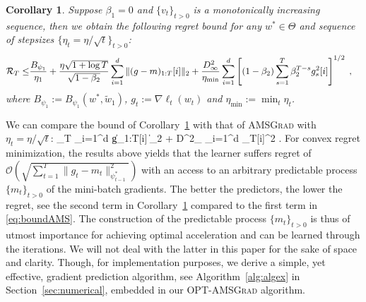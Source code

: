 \documentclass[11pt]{article}
\newtheorem{Corollary}{Corollary}
\theoremstyle{k}
\begin{document}
\begin{Corollary}\label{cor:corollary}
Suppose $\beta_1=0$ and $\{v_t\}_{t>0}$ is a monotonically increasing sequence, then we obtain the following regret bound for any $w^{*} \in \Theta$ and sequence of stepsizes $\{ \eta_t = \eta/\sqrt{t}\}_{t>0}$: 
\begin{equation}\notag
\begin{aligned}
\mathcal{R}_T \leq & \frac{ B_{\psi_1}}{\eta_1}
+ \frac{\eta \sqrt{1 + \log T}}{\sqrt{1 - \beta_2}} \sum_{i=1}^d \| (g-m)_{1:T}[i] \|_2 +\frac{D_{\infty}^2}{\eta_{\min}} \sum_{i=1}^d \left[ (1-\beta_2) \sum_{s=1}^{T} \beta_2^{T-s} g^2_s[i] \right]^{1/2} \;,
\end{aligned}
\end{equation}
where $B_{\psi_1} := B_{\psi_1}(w^*, \tilde{w}_{1})$, $g_{t}:= \nabla \ell_{t}(w_t)$ and $\eta_{{\min}} := \min_{{t}} \eta_{t}$.
\end{Corollary}
We can compare the bound of Corollary~\ref{cor:corollary} with that of \textsc{AMSGrad} \citep{RKK18} with $\eta_t = \eta/\sqrt{t}$:
\beq\label{eq:boundAMS}
_T \leq {} \sum_{i=1}^d \| g_{1:T}[i]  \|_2 + D^2_{\infty} \sum_{i=1}^d _T[i]^2 \eqsp.
\eeq
For convex regret minimization, the results above yields that the learner suffers regret of $\mathcal{O}(\sqrt{\sum_{t=1}^T \| g_t - m_t  \|^2_{\psi^*_{t-1}}})$ with an access to an arbitrary predictable process $\{m_t\}_{t>0}$ of the mini-batch gradients. 
The better the predictors, the lower the regret, see the second term in Corollary~\ref{cor:corollary} compared to the first term in \eqref{eq:boundAMS}.
The construction of the predictable process $\{m_t\}_{t>0}$ is thus of utmost importance for achieving optimal acceleration and can be learned through the iterations.
We will not deal with the latter in this paper for the sake of space and clarity.
Though, for implementation purposes, we derive a simple, yet effective, gradient prediction algorithm, see Algorithm~\ref{alg:algex} in Section~\ref{sec:numerical}, embedded in our \textsc{OPT-AMSGrad} algorithm.
\end{document}
